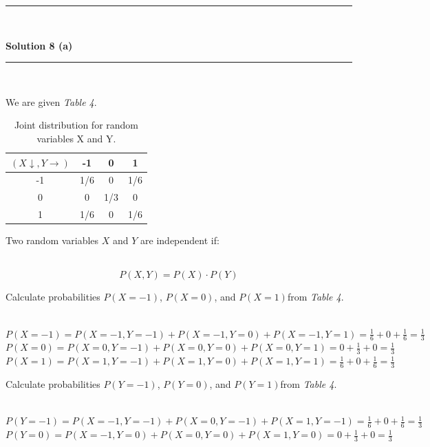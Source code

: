 \documentclass{article}
\begin{document}
\noindent\rule{\textwidth}{0.4pt}\\

\newpage

\textbf{Solution 8 (a)}

\noindent\rule{\textwidth}{0.4pt}\\

\parbox{\textwidth}{We are given \textit{Table 4}.}

\begin{table}[h]
  \centering
  \begin{tabular}{c|ccc}
  $(X\downarrow ,Y \rightarrow)$ & -1 & 0 & 1 \\ \hline
  -1 & 1/6 & 0 & 1/6 \\
  0 & 0 & 1/3 & 0 \\
  1 & 1/6 & 0 & 1/6 \\
  \end{tabular}
  \caption{Joint distribution for random variables X and Y.}
  \label{tab:example_fractions}
  \end{table}

\parbox{\textwidth}{Two random variables $X$ and $Y$ are independent if:}\\

$$P(X, Y) = P(X) \cdot P(Y)$$


\parbox{\textwidth}{Calculate probabilities $P(X = -1)$, $P(X = 0)$, and $P(X = 1)$from \textit{Table 4}.}\\

$P(X = -1) = P(X = -1, Y = -1) + P(X = -1, Y = 0) + P(X = -1, Y = 1) = \frac{1}{6} + 0 + \frac{1}{6} = \frac{1}{3}$\\

$P(X = 0) = P(X = 0, Y = -1) + P(X = 0, Y = 0) + P(X = 0, Y = 1) = 0 + \frac{1}{3} + 0 =\frac{1}{3}$\\

$P(X = 1) = P(X = 1, Y = -1) + P(X = 1, Y = 0) + P(X = 1, Y = 1) = \frac{1}{6} + 0 + \frac{1}{6} = \frac{1}{3}$\\


\parbox{\textwidth}{Calculate probabilities $P(Y = -1)$, $P(Y = 0)$, and $P(Y = 1)$from \textit{Table 4}.}\\

$P(Y = -1) = P(X = -1, Y = -1) + P(X = 0, Y = -1) + P(X = 1, Y = -1) =  \frac{1}{6} + 0 + \frac{1}{6} = \frac{1}{3}$\\

$P(Y = 0) = P(X = -1, Y = 0) + P(X = 0, Y = 0) + P(X = 1, Y = 0)= 0 + \frac{1}{3} + 0 =\frac{1}{3}$\\
\end{document}
